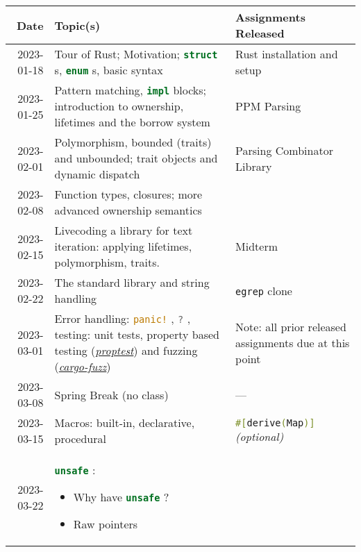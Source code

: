 \documentclass{article}
\newcommand{\code}[2][]{{\sloppy
\ifmmode
\text{\lstinline[language=rust,#1]`#2`}
\else
{\lstinline[language=rust,#1]`#2`}%
\fi}}
\begin{document}
\begin{longtable}{rp{}@{\hskip .05\textwidth}p{}}
    Date        & Topic(s)                          & Assignments Released  \\
    \toprule
    2023-01-18  & Tour of Rust; Motivation;
                  \code{struct}s, \code{enum}s, basic syntax
                & Rust installation and setup                               \\
    2023-01-25  & Pattern matching, \code{impl} blocks; introduction to
                  ownership, lifetimes and the borrow system
                & PPM Parsing                                               \\
    2023-02-01  & Polymorphism, bounded (traits) and unbounded; trait objects
                  and dynamic dispatch
                & Parsing Combinator Library                                \\
    2023-02-08  & Function types, closures; more advanced ownership semantics
                &                                                           \\
    2023-02-15  & Livecoding a library for text iteration: applying lifetimes,
                  polymorphism, traits.
                & Midterm                                                   \\
    2023-02-22  & The standard library and string handling
                & \texttt{egrep} clone                                      \\
    2023-03-01  & Error handling: \code{panic!}, \code{?}, testing: unit tests,
                  property based testing
                  (\href{https://github.com/AltSysrq/proptest}{\textit{proptest}})
                  and fuzzing
                  (\href{https://github.com/rust-fuzz/cargo-fuzz}{\textit{cargo-fuzz}})
                & Note: all prior released assignments due at this point    \\
    2023-03-08  & Spring Break (no class)
                & ---                                                       \\
    2023-03-15  & Macros: built-in, declarative, procedural
                & \code{#[derive(Map)]} \textit{(optional)}                 \\
    2023-03-22  & \code{unsafe}: \begin{itemize}
                        \item Why have \code{unsafe}?
                        \item Raw pointers

\end{itemize}
\end{longtable}
\end{document}
